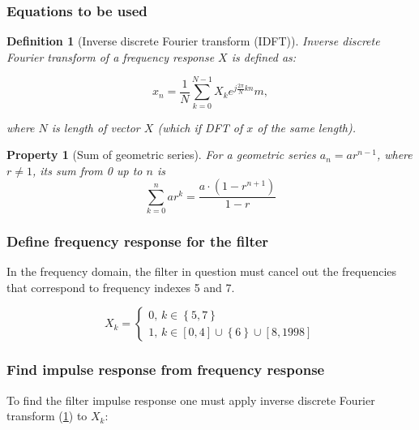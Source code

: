 \documentclass[a4paper]{article}
\theoremstyle{break}
\newtheorem{definition}{Definition}[section]
\theoremstyle{break}
\newtheorem{property}{Property}[section]
\begin{document}
\subsubsection*{Equations to be used}

\begin{definition}[Inverse discrete Fourier transform (IDFT)] \label{def:idft}
  Inverse discrete Fourier transform of a frequency response $X$ is defined as:

  \begin{equation} \label{eq:idft}
    x_n = \frac{1}{N} \sum_{k=0}^{N - 1} X_k e^{j \frac{2 \pi }{N} k n}m,
  \end{equation}

  where $N$ is length of vector $X$ (which if DFT of $x$ of the same length).
\end{definition}

\begin{property}[Sum of geometric series]
  For a geometric series $a_{n} = a r^{n - 1}$, where $r \neq 1$, its sum from 0 up to $n$ is
  \begin{equation} \label{eq:geom_sum}
    \sum_{k=0}^{n} a r^{k} = \frac{a \cdot \left( 1 - r^{n + 1} \right)}{1 - r}
  \end{equation}
\end{property}

\subsubsection*{Define frequency response for the filter}

In the frequency domain, the filter in question must cancel out the frequencies that correspond to frequency indexes 5 and 7.

\begin{equation*}
  X_k = \begin{cases}
          0, \, k \in \left\{ 5, 7 \right\} \\
          1, \, k \in [0, 4] \cup \left\{ 6 \right\} \cup [8, 1998]
        \end{cases}
\end{equation*}

\subsubsection*{Find impulse response from frequency response}

To find the filter impulse response one must apply inverse discrete Fourier transform (\ref{def:idft}) to $X_k$:
\end{document}
